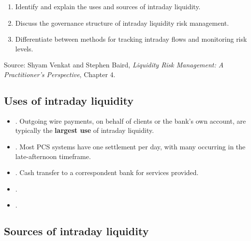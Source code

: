 
\begin{lrkeybox}
\begin{enumerate}[label=\textbf{\alph*.}]
\item Identify and explain the uses and sources of intraday liquidity.
\item Discuss the governance structure of intraday liquidity risk management.
\item Differentiate between methods for tracking intraday flows and monitoring risk levels.
\end{enumerate}
{\footnotesize\color{FRMGrey}Source: Shyam Venkat and Stephen Baird, \textit{Liquidity Risk Management: A Practitioner's Perspective}, Chapter 4.}
\end{lrkeybox}


\subsection{Uses of intraday liquidity}

\begin{itemize}
\item {}. Outgoing wire payments, on behalf of clients or the bank's own account, are typically the \textbf{largest use} of intraday liquidity.
\item {}. Most PCS systems have one settlement per day, with many occurring in the late-afternoon timeframe.
\item {}. Cash transfer to a correspondent bank for services provided.
\item {}.
\item {}.
\end{itemize}

\subsection{Sources of intraday liquidity}


